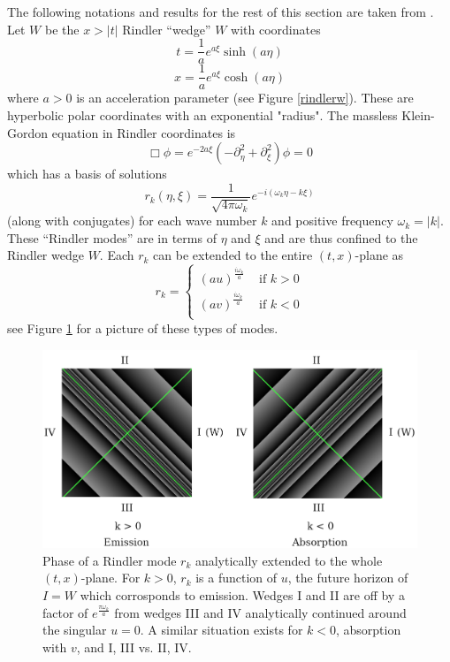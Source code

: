 \documentclass[12pt,a4paper]{article}
\begin{document}
The following notations and results for the rest of this section are taken from \cite{Frodden}. Let $W$ be the $x>|t|$ Rindler ``wedge'' $W$ with coordinates
\begin{equation}
  t = \frac{1}{a}e^{a\xi}\sinh{(a\eta)}
\label{sinh}
\end{equation}
\begin{equation}
x = \frac{1}{a}e^{a\xi}\cosh{(a\eta)}
\end{equation}
where $a>0$ is an acceleration parameter (see Figure \ref{rindlerw}). These are hyperbolic polar coordinates with an exponential "radius".  The massless Klein-Gordon equation in Rindler coordinates is
\begin{equation}
  \Box \phi = e^{-2a \xi}(-\partial_\eta^2 + \partial_\xi^2) \phi = 0
\end{equation}
which has a basis of solutions 
\begin{equation}
 r_k(\eta,\xi) = \frac{1}{\sqrt{4 \pi \omega_k}} e^{-i(\omega_k \eta -k \xi)}
\end{equation}
(along with conjugates) for each wave number $k$ and positive frequency $\omega_k = |k|$.  These ``Rindler modes'' are in terms of $\eta$ and $\xi$ and are thus confined to the Rindler wedge $W$.  Each $r_k$ can be extended to the entire $(t,x)$-plane as
\begin{equation}
  r_k = \left\{\begin{array}{cc}
      {(au)}^{\frac{i\omega_k}{a}} & \text{ if } k > 0 \\
      {(av)}^{\frac{i\omega_k}{a}} & \text{ if } k < 0 \\  
    \end{array}\right.
\end{equation}
see Figure \ref{analytic} for a picture of these types of modes.
\begin{figure}[h]
  \centering
  \captionsetup{width=0.8\linewidth}
\includegraphics[scale=0.3]{analytic.png}
\caption{Phase of a Rindler mode $r_k$ analytically extended to the whole $(t,x)$-plane. For $k>0$, $r_k$ is a function of $u$, the future horizon of $I = W$ which corrosponds to emission.  Wedges I and II are off by a factor of $e^{\frac{\pi \omega_k}{a}}$ from wedges III and IV analytically continued around the singular $u=0$.  A similar situation exists for $k<0$, absorption with $v$, and I, III vs. II, IV.}
\label{analytic}
\end{figure}
\end{document}
